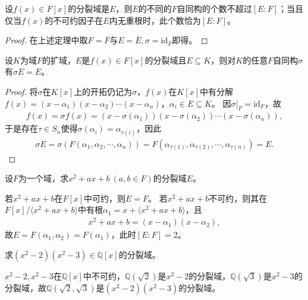 \documentclass[../../main.tex]{subfiles}%
\begin{document}
\begin{corollary}
设$f(x)\in F[x]$的分裂域是$E$，则$E$的不同的$F$自同构的个数不超过$[E:F]$；当且仅当$f(x)$的不可约因子在$E$内无重根时，此个数恰为$[E:F]$。
\end{corollary}

\begin{proof}
在上述定理中取$F=\overline{F}$与$E=\overline{E},\sigma=\mathrm{id}_F$即得。
\end{proof}

\begin{corollary}
设$K$为域$F$的扩域，$E$是$f(x)\in F[x]$的分裂域且$E\subseteq K$，则对$K$的任意$F$自同构$\sigma$有$\sigma E=E$。
\end{corollary}

\begin{proof}
将$\sigma$在$K[x]$上的开拓仍记为$\sigma$，$f(x)$在$K[x]$中有分解$f(x)=(x-\alpha_1)(x-\alpha_2)\cdots(x-\alpha_n)$，$\alpha_i\in E\subseteq K$。
因$\sigma|_F=\mathrm{id}_F$，故
\begin{align*}
f(x)=\sigma f(x)=(x-\sigma(\alpha_1))(x-\sigma(\alpha_2))\cdots(x-\sigma(\alpha_n)),
\end{align*}
于是存在$\tau\in S_n$使得$\sigma(\alpha_i)=\alpha_{\tau(i)}$，因此
\begin{align*}
\sigma E=\sigma(F(\alpha_1,\alpha_2,\cdots,\alpha_n))=F(\alpha_{\tau(1)},\alpha_{\tau(2)},\cdots,\alpha_{\tau(n)})=E.
\end{align*}
\end{proof}

\begin{example}
设$F$为一个域，求$x^2+ax+b\ (a,b\in F)$的分裂域$E$。
\end{example}
\begin{solution}
若$x^2+ax+b$在$F[x]$中可约，则$E=F$。
若$x^2+ax+b$不可约，则其在$F[x]/\langle x^2+ax+b\rangle$中有根$\alpha_1=x+\langle x^2+ax+b\rangle$，且
\begin{align*}
x^2+ax+b=(x-\alpha_1)(x-\alpha_2),
\end{align*}
故$E=F(\alpha_1,\alpha_2)=F(\alpha_1)$，此时$[E:F]=2$。

\end{solution}

\begin{example}
求$(x^2-2)(x^2-3)\in\mathbb{Q}[x]$的分裂域。
\end{example}
\begin{solution}
$x^2-2,x^2-3$在$\mathbb{Q}[x]$中不可约，$\mathbb{Q}(\sqrt{2})$是$x^2-2$的分裂域，$\mathbb{Q}(\sqrt{3})$是$x^2-3$的分裂域，故$\mathbb{Q}(\sqrt{2},\sqrt{3})$是$(x^2-2)(x^2-3)$的分裂域。

\end{solution}
\end{document}
